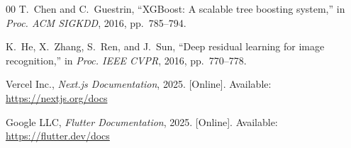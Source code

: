 \documentclass[conference,twocolumn,letterpaper]{IEEEtran}
\begin{document}
\begin{thebibliography}{00}
T.~Chen and C.~Guestrin, ``XGBoost: A scalable tree boosting system,'' in \textit{Proc. ACM SIGKDD}, 2016, pp.~785--794.

K.~He, X.~Zhang, S.~Ren, and J.~Sun, ``Deep residual learning for image recognition,'' in \textit{Proc. IEEE CVPR}, 2016, pp.~770--778.

Vercel Inc., \textit{Next.js Documentation}, 2025. [Online]. Available: \url{https://nextjs.org/docs}

Google LLC, \textit{Flutter Documentation}, 2025. [Online]. Available: \url{https://flutter.dev/docs}

\end{thebibliography}
\end{document}
